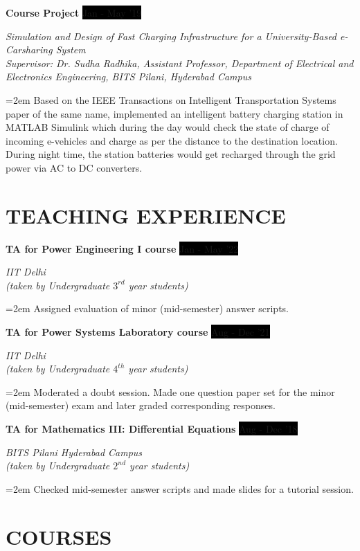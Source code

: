 \documentclass[paper=a4,fontsize=11pt]{scrartcl} %
\newcommand{\sepspace}{\vspace*{1em}}		%
\newcommand{\NewPart}[1]{\section*{\uppercase{#1}}}
\newcommand{\EducationEntry}[4]{
		\noindent \textbf{#1} \hfill      %
		\colorbox{Black}{%
			\parbox{10em}{%
			\hfill\color{White}#2}} \par  %
		\noindent \textit{#3} \par        %
		\noindent\hangindent=2em\hangafter=0 \small #4 %
		\normalsize \par}
\newcommand{\WorkEntry}[4]{				  %
		\noindent \textbf{#1} \hfill      %
		\colorbox{Black}{\color{White}#2} \par  %
		\noindent \textit{#3} \par              %
		\noindent\hangindent=2em\hangafter=0 \small #4 %
		\normalsize \par}
\begin{document}
\sepspace
\WorkEntry{Course Project}{Jan - May '19}{Simulation and Design of Fast Charging Infrastructure for a University-Based e-Carsharing System\\ Supervisor: Dr. Sudha Radhika, Assistant Professor, Department of Electrical and Electronics Engineering, BITS Pilani, Hyderabad Campus}{Based on the IEEE Transactions on Intelligent Transportation Systems paper of the same name, implemented an intelligent battery charging station in MATLAB Simulink which during the day would check the state of charge of incoming e-vehicles and charge as per the distance to the destination location. During night time, the station batteries would get recharged through the grid power via AC to DC converters.}

\NewPart{Teaching Experience}{}

\WorkEntry{TA for Power Engineering I course}{Jan - May '22}{IIT Delhi\\ (taken by Undergraduate $3^{rd}$ year students)}{Assigned evaluation of minor (mid-semester) answer scripts.}
\sepspace

\WorkEntry{TA for Power Systems Laboratory course}{Aug - Dec '21}{IIT Delhi\\ (taken by Undergraduate $4^{th}$ year students)}{Moderated a doubt session. Made one question paper set for the minor (mid-semester) exam and later graded corresponding responses.}
\sepspace
\sepspace
\WorkEntry{TA for Mathematics III: Differential Equations}{Aug - Dec '18}{BITS Pilani Hyderabad Campus\\ (taken by Undergraduate $2^{nd}$ year students)}{Checked mid-semester answer scripts and made slides for a tutorial session.}

\NewPart{Courses}{}
\end{document}
